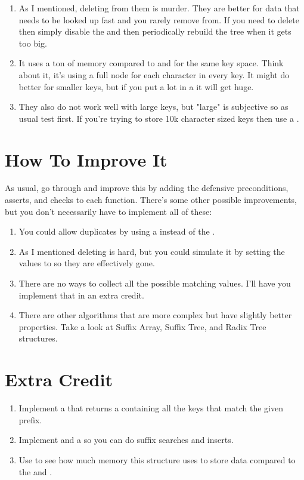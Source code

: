\begin{enumerate}
\item As I mentioned, deleting from them is murder.  They are better for 
    data that needs to be looked up fast and you rarely remove from.  If you
    need to delete then simply disable the  and then periodically
    rebuild the tree when it gets too big.
\item It uses a ton of memory compared to  and 
    for the same key space.  Think about it, it's using a full node for
    each character in every key.  It might do better for smaller keys, but if you
    put a lot in a  it will get huge.
\item They also do not work well with large keys, but "large" is subjective
    so as usual test first.  If you're trying to store 10k character sized keys then use a .
\end{enumerate}



\section{How To Improve It}

As usual, go through and improve this by adding the defensive preconditions,
asserts, and checks to each function.  There's some other possible 
improvements, but you don't necessarily have to implement all of these:

\begin{enumerate}
\item You could allow duplicates by using a  instead of the 
    .
\item As I mentioned deleting is hard, but you could simulate it by setting
    the values to  so they are effectively gone.
\item There are no ways to collect all the possible matching values.  I'll have
    you implement that in an extra credit.
\item There are other algorithms that are more complex but have slightly
    better properties.  Take a look at Suffix Array, Suffix Tree, and 
    Radix Tree structures.
\end{enumerate}

\section{Extra Credit}

\begin{enumerate}
\item Implement a  that returns a  containing
    all the keys that match the given prefix.
\item Implement  and a 
    so you can do suffix searches and inserts.
\item Use  to see how much memory this structure uses to store
    data compared to the  and .
\end{enumerate}

